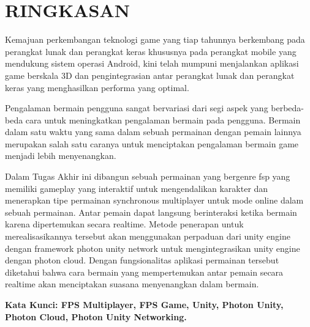 \chapter*{RINGKASAN}
\noindent

Kemajuan perkembangan teknologi game yang tiap 
tahunnya berkembang pada perangkat lunak dan perangkat keras 
khususnya pada perangkat mobile yang mendukung sistem 
operasi Android, kini telah mumpuni menjalankan aplikasi game 
berskala 3D dan pengintegrasian antar perangkat lunak dan 
perangkat keras yang menghasilkan performa yang optimal. 

Pengalaman bermain pengguna sangat bervariasi dari 
segi aspek yang berbeda-beda cara untuk meningkatkan 
pengalaman bermain pada pengguna. Bermain dalam satu waktu 
yang sama dalam sebuah permainan dengan pemain lainnya 
merupakan salah satu caranya untuk menciptakan pengalaman 
bermain game menjadi lebih menyenangkan. 

Dalam Tugas Akhir ini dibangun sebuah permainan yang 
bergenre fsp yang memiliki gameplay yang interaktif untuk 
mengendalikan karakter dan menerapkan tipe permainan 
synchronous multiplayer untuk mode online dalam sebuah 
permainan. Antar pemain dapat langsung berinteraksi ketika 
bermain karena dipertemukan secara realtime. Metode 
penerapan untuk merealisasikannya tersebut akan menggunakan 
perpaduan dari unity engine dengan framework photon unity 
network untuk mengintegrasikan unity engine dengan photon 
cloud. Dengan fungsionalitas aplikasi permainan tersebut 
diketahui bahwa cara bermain yang mempertemukan antar 
pemain secara realtime akan menciptakan suasana 
menyenangkan dalam bermain.

\noindent \textbf{Kata Kunci: FPS Multiplayer, FPS Game, Unity, Photon Unity, Photon Cloud, Photon Unity Networking.}